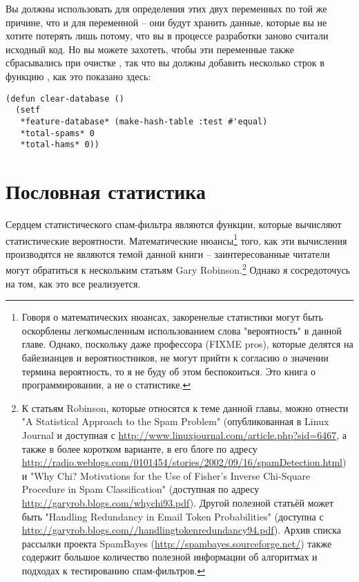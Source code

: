 Вы должны использовать  для определения этих двух переменных по той же
причине, что и для переменной  -- они будут хранить данные,
которые вы не хотите потерять лишь потому, что вы в процессе разработки заново считали
исходный код.  Но вы можете захотеть, чтобы эти переменные также сбрасывались при очистке
, так что вы должны добавить несколько строк в функцию
, как это показано здесь:

\begin{lstlisting}
(defun clear-database ()
  (setf
   *feature-database* (make-hash-table :test #'equal)
   *total-spams* 0
   *total-hams* 0))
\end{lstlisting}

\section{Пословная статистика}

Сердцем статистического спам-фильтра являются функции, которые вычисляют статистические
вероятности.  Математические нюансы\footnote{Говоря о математических нюансах, закоренелые
  статистики могут быть оскорблены легкомысленным использованием слова "вероятность" в
  данной главе.  Однако, поскольку даже профессора (FIXME pros), которые делятся на
  байезианцев и вероятностников, не могут прийти к согласию о значении термина
  вероятность, то я не буду об этом беспокоиться.  Это книга о программировании, а не о
  статистике.} того, как эти вычисления производятся не являются темой данной книги --
заинтересованные читатели могут обратиться к нескольким статьям Gary Robinson.\footnote{К
  статьям Robinson, которые относятся к теме данной главы, можно отнести "A Statistical
  Approach to the Spam Problem" (опубликованная в Linux Journal и доступная с
  \url{http://www.linuxjournal.com/article.php?sid=6467}, а также в более коротком
  варианте, в его блоге по адресу
  \url{http://radio.weblogs.com/0101454/stories/2002/09/16/spamDetection.html}) и "Why
  Chi?  Motivations for the Use of Fisher's Inverse Chi-Square Procedure in Spam
  Classification" (доступная по адресу \url{http://garyrob.blogs.com/whychi93.pdf}).
  Другой полезной статьёй может быть "Handling Redundancy in Email Token Probabilities"
  (доступна с \url{http://garyrob.blogs.com//handlingtokenredundancy94.pdf}).  Архив
  списка рассылки проекта SpamBayes (\url{http://spambayes.sourceforge.net/}) также
  содержит большое количество полезной информации об алгоритмах и подходах к тестированию
  спам-фильтров.}  Однако я сосредоточусь на том, как это все реализуется.

